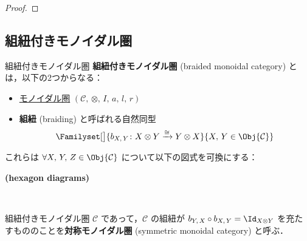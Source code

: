 \documentclass[TQFT_main]{subfiles}
\begin{document}
\begin{proof}
\end{proof}

\subsection{組紐付きモノイダル圏}

\begin{mydef}[label=redef:braided-monoidal]{組紐付きモノイダル圏}
    \textbf{組紐付きモノイダル圏} (braided monoidal category) とは，以下の2つからなる：
    \begin{itemize}
        \item \hyperref[redef:monoidal-category]{モノイダル圏} $(\mathcal{C},\, \otimes,\, I,\, a,\, l,\, r)$
        \item \textbf{組紐} (braiding) と呼ばれる自然同型
        \begin{align}
            \Familyset[\big]{b_{X,\, Y} \colon X \otimes Y \xrightarrow{\cong} Y \otimes X}{X,\, Y \in \Obj{\mathcal{C}}}
        \end{align}
    \end{itemize}
    これらは $\forall X,\, Y,\, Z \in \Obj{\mathcal{C}}$ について以下の図式を可換にする：
    \begin{description}
        \item[\textbf{(hexagon diagrams)}]　
        
        \begin{center}
        \end{center}
        
        \begin{center}
        \end{center}
    \end{description}
    \tcblower
    組紐付きモノイダル圏 $\mathcal{C}$ であって，$\mathcal{C}$ の組紐が $b_{Y,\, X} \circ b_{X,\, Y} = \Id_{X \otimes Y}$ を充たすもののことを\textbf{対称モノイダル圏} (symmetric monoidal category) と呼ぶ．
\end{mydef}
\end{document}
